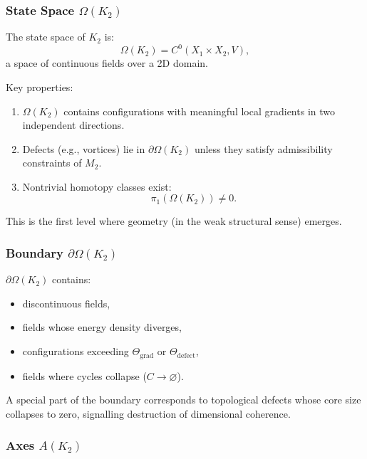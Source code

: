 \subsubsection{State Space \texorpdfstring{$\Omega(K_2)$}{\Omega(K_2)}}

The state space of $K_2$ is:
\[
\Omega(K_2) = C^0(X_1 \times X_2, V),
\]
a space of continuous fields over a 2D domain.

Key properties:
\begin{enumerate}
    \item $\Omega(K_2)$ contains configurations with meaningful local
          gradients in two independent directions.
    \item Defects (e.g., vortices) lie in $\partial\Omega(K_2)$ unless
          they satisfy admissibility constraints of $M_2$.
    \item Nontrivial homotopy classes exist:
          \[
          \pi_1(\Omega(K_2)) \neq 0.
          \]
\end{enumerate}

This is the first level where geometry (in the weak structural sense)
emerges.

\subsubsection{Boundary \texorpdfstring{$\partial\Omega(K_2)$}{\partial\Omega(K_2)}}

$\partial\Omega(K_2)$ contains:
\begin{itemize}
    \item discontinuous fields,
    \item fields whose energy density diverges,
    \item configurations exceeding $\Theta_{\mathrm{grad}}$ or
          $\Theta_{\mathrm{defect}}$,
    \item fields where cycles collapse ($C \to \varnothing$).
\end{itemize}

A special part of the boundary corresponds to topological defects whose
core size collapses to zero, signalling destruction of dimensional
coherence.

\subsubsection{Axes \texorpdfstring{$A(K_2)$}{A(K_2)}}


